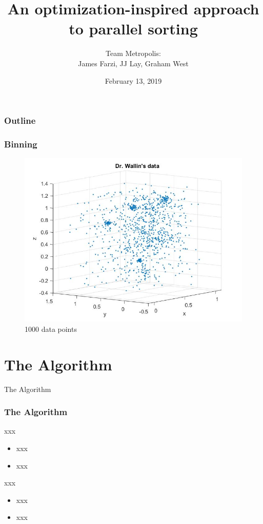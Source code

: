 \documentclass{beamer}
\title[Capstone]{An optimization-inspired approach to parallel sorting}
\author{Team Metropolis:\\
James Farzi, JJ Lay, Graham West}
\date{February 13, 2019}
\begin{document}
\frame{\titlepage}

\begin{frame}	
	\frametitle{Outline}
	\tableofcontents	
\end{frame}

\begin{frame}
	\frametitle{Binning}
	
	\begin{figure}[!htb]
		\centering
		\vspace{-5pt}
		\includegraphics[scale = 0.4]{WallinDataPlot}
		\vspace{-10pt}
		\caption{1000 data points}
	\end{figure}
\end{frame}


\section{The Algorithm}

\begin{frame}	
	\begin{Huge}
		\begin{center}
			The Algorithm
		\end{center}
	\end{Huge}
\end{frame}

\begin{frame}	
	\frametitle{The Algorithm}
	
	\begin{block}{xxx}
		\begin{itemize}
			\item xxx
			\item xxx
		\end{itemize}
	\end{block}
	
	\begin{block}{xxx}
		\begin{itemize}
			\item xxx
			\item xxx
		\end{itemize}
	\end{block}
\end{frame}
\end{document}

